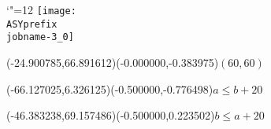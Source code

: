 \setlength{\unitlength}{1pt}%
\makeatletter%
\let\ASYencoding\f@encoding%
\let\ASYfamily\f@family%
\let\ASYseries\f@series%
\let\ASYshape\f@shape%
\makeatother%
{\catcode`"=12%
\texttt{[image: \\ASYprefix\\jobname-3\_0]}%
}%
%
\fontsize{6.000000}{7.200000}\selectfont%
\usefont{\ASYencoding}{\ASYfamily}{\ASYseries}{\ASYshape}%
\ASYalign(-24.900785,66.891612)(-0.000000,-0.383975){$(60,60)$}%
%
\fontsize{6.000000}{7.200000}\selectfont%
\ASYalign(-66.127025,6.326125)(-0.500000,-0.776498){$a\le b+20$}%
%
\fontsize{6.000000}{7.200000}\selectfont%
\ASYalign(-46.383238,69.157486)(-0.500000,0.223502){$b\le a+20$}%
